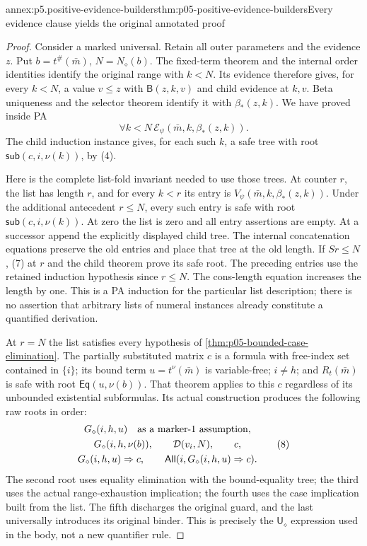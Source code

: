 \begin{annexitem}{annex:p5.positive-evidence-builders}{thm:p05-positive-evidence-builders}{Every evidence clause yields the original annotated proof}
\begin{proof}
Consider a marked universal. Retain all outer parameters and the
evidence \(z\). Put \(b=t^\#(\bar m)\),
\(N=N_\diamond(b)\). The fixed-term theorem and the internal order
identities identify the original range with \(k<N\). Its evidence
therefore gives, for every \(k<N\), a value \(v\leq z\) with
\(\mathsf B(z,k,v)\) and child evidence at \(k,v\). Beta
uniqueness and the selector theorem identify it with
\(\beta_*(z,k)\). We have proved inside PA
\[
 \forall k<N\,
       \mathcal E_\psi(\bar m,k,\beta_*(z,k)).
\tag{7}
\]
The child induction instance gives, for each such \(k\), a safe
tree with root \(\mathsf{sub}(c,i,\nu(k))\), by (4).

Here is the complete list-fold invariant needed to use those trees.
At counter \(r\), the list has length \(r\), and for every
\(k<r\) its entry is
\(V_\psi(\bar m,k,\beta_*(z,k))\). Under the additional
antecedent \(r\leq N\), every such entry is safe with root
\(\mathsf{sub}(c,i,\nu(k))\). At zero the list is zero and all
entry assertions are empty. At a successor append the explicitly
displayed child tree. The internal concatenation equations preserve
the old entries and place that tree at the old length. If \(Sr\leq N\),
(7) at \(r\) and the child theorem prove its safe root. The
preceding entries use the retained induction hypothesis since
\(r\leq N\). The cons-length equation increases the length by
one. This is a PA induction for the particular list description;
there is no assertion that arbitrary lists of numeral instances
already constitute a quantified derivation.

At \(r=N\) the list satisfies every hypothesis of
\cref{thm:p05-bounded-case-elimination}. The partially substituted
matrix \(c\) is a formula with free-index set contained in
\(\{i\}\); its bound term \(u=t^\nu(\bar m)\) is
variable-free; \(i\ne h\); and \(R_t(\bar m)\) is safe with
root \(\mathsf{Eq}(u,\nu(b))\). That theorem applies to this
\(c\) regardless of its unbounded existential subformulas. Its
actual construction produces the following raw roots in order:
\[
\begin{gathered}
 G_\diamond(i,h,u)\quad\hbox{as a marker-1 assumption},\\
 G_\diamond(i,h,\nu(b)),\qquad
 \mathcal D(v_i,N),\qquad c,\\
 G_\diamond(i,h,u)\Rightarrow c,\qquad
 \mathsf{All}(i,G_\diamond(i,h,u)\Rightarrow c).
\end{gathered}
\tag{8}
\]
The second root uses equality elimination with the bound-equality
tree; the third uses the actual range-exhaustion implication; the
fourth uses the case implication built from the list. The fifth
discharges the original guard, and the last universally introduces
its original binder. This is precisely the \(\mathsf U_\diamond\)
expression used in the body, not a new quantifier rule.


\end{proof}
\end{annexitem}
